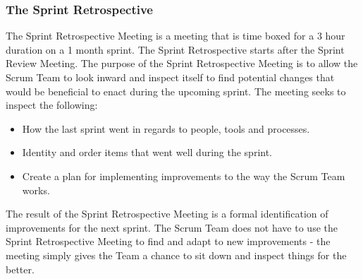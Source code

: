 \subsubsection{The Sprint Retrospective}


The Sprint Retrospective Meeting is a meeting that is time boxed for a 3 hour duration on a 1 month sprint. The Sprint Retrospective starts after the Sprint Review Meeting.
The purpose of the Sprint Retrospective Meeting is to allow the Scrum Team to look inward and inspect itself to find potential changes that would be beneficial to enact during the upcoming sprint\cite{scrumguide11}. The meeting seeks to inspect the following:\cite{scrumguide11}

\begin{itemize}
	\item	How the last sprint went in regards to people, tools and processes. 
	\item Identity and order items that went well during the sprint.
	\item	Create a plan for implementing improvements to the way the Scrum Team works.
\end{itemize}


The result of the Sprint Retrospective Meeting is a formal identification of improvements for the next sprint\cite{scrumguide11}. The Scrum Team does not have to use the Sprint Retrospective Meeting to find and adapt to new improvements - the meeting simply gives the Team a chance to sit down and inspect things for the better\cite{scrumguide11}.